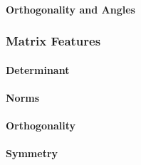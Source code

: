 \paragraph{Orthogonality and Angles}
% 

\subsubsection{Matrix Features}

\paragraph{Determinant}

\paragraph{Norms}

\paragraph{Orthogonality}

\paragraph{Symmetry}

